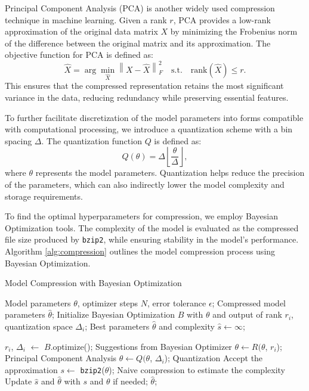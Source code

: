 \documentclass{article}
\begin{document}
Principal Component Analysis (PCA) is another widely used compression technique in machine learning. Given a rank $r$, PCA provides a low-rank approximation of the original data matrix $X$ by minimizing the Frobenius norm of the difference between the original matrix and its approximation. The objective function for PCA is defined as:  
$$
\hat{X} = \arg\min_{\hat{X}} \left\| X - \hat{X} \right\|_F^2 \quad \text{s.t.} \quad \text{rank}(\hat{X}) \le r.
$$  
This ensures that the compressed representation retains the most significant variance in the data, reducing redundancy while preserving essential features.

To further facilitate discretization of the model parameters into forms compatible with computational processing, we introduce a quantization scheme with a bin spacing $\Delta$. The quantization function $Q$ is defined as:  
$$
Q(\theta) = \Delta \left\lfloor \frac{\theta}{\Delta} \right\rfloor,
$$  
where $\theta$ represents the model parameters. Quantization helps reduce the precision of the parameters, which can also indirectly lower the model complexity and storage requirements.

To find the optimal hyperparameters for compression, we employ Bayesian Optimization tools. The complexity of the model is evaluated as the compressed file size produced by \texttt{bzip2}, while ensuring stability in the model's performance. Algorithm \ref{alg:compression} outlines the model compression process using Bayesian Optimization.  

\begin{algorithm}[!ht]
    \renewcommand{\algorithmicrequire}{\textbf{Input:}}
    \renewcommand{\algorithmicensure}{\textbf{Output:}}
    \caption{Model Compression with Bayesian Optimization}
    \label{alg:compression}
    \begin{algorithmic}[1]
        \Require Model parameters $\theta$, optimizer steps $N$, error tolerance $\epsilon$;
        \Ensure Compressed model parameters $\hat{\theta}$;
        \State Initialize Bayesian Optimization $B$ with $\theta$ and output of rank $r_i$, quantization space $\Delta_i$;
        \State Best parameters $\hat{\theta}$ and complexity $\hat{s} \leftarrow \infty$;
    
        \State $r_i$, $\Delta_i$ $\leftarrow$ $B$.optimize();
        \Comment Suggestions from Bayesian Optimizer
        \State $\theta \leftarrow R(\theta$, $r_i$);
        \Comment Principal Component Analysis
        \State $\theta \leftarrow Q(\theta$, $\Delta_i$);
        \Comment Quantization
        \Comment Accept the approximation
            \State $s \leftarrow$ \texttt{bzip2}($\theta$);
            \Comment Naive compression to estimate the complexity
            \State Update $\hat{s}$ and $\hat{\theta}$ with $s$ and $\theta$ if needed;
        \EndIf
        \EndFor
        \State \Return $\hat{\theta}$;
 \end{algorithmic}
\end{algorithm}
\end{document}
